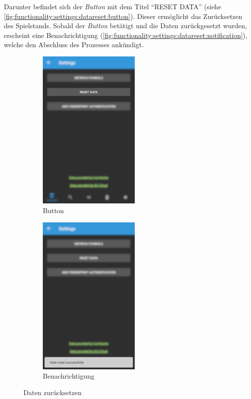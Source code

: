 \documentclass[a4paper]{article}
\begin{document}
Darunter befindet sich der \textit{Button} mit dem Titel "`RESET DATA"' (siehe \autoref{fig:functionality:settings:datareset:button}).
Dieser ermöglicht das Zurücksetzen des Spielstands.
Sobald der \textit{Button} betätigt und die Daten zurückgesetzt wurden, erscheint eine Benachrichtigung (\autoref{fig:functionality:settings:datareset:notification}), welche den Abschluss des Prozesses ankündigt.

\begin{figure}[H]
    \begin{subfigure}{.5\textwidth}
        \centering
        \includegraphics[height=8cm,keepaspectratio]{./images/settings/data_reset_button.png}
        \caption{Button}
        \label{fig:functionality:settings:datareset:button}
    \end{subfigure}
    \begin{subfigure}{.5\textwidth}
        \centering
        \includegraphics[height=8cm,keepaspectratio]{./images/settings/data_reset_done.png}
        \caption{Benachrichtigung}
        \label{fig:functionality:settings:datareset:notification}
    \end{subfigure}
    \caption{Daten zurücksetzen}
    \label{fig:functionality:settings:datareset}
\end{figure}
\end{document}
